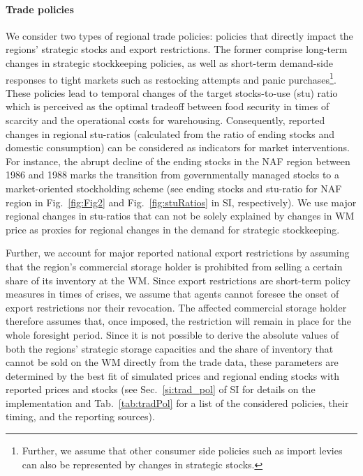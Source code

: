 \documentclass[12pt]{article}
\begin{document}
\paragraph*{Trade policies}
\label{sec:trad_pol}
We consider two types of regional trade policies: policies that directly impact the regions' strategic stocks and export restrictions. The former comprise long-term changes in strategic stockkeeping policies, as well as short-term demand-side responses to tight markets such as restocking attempts and panic purchases\footnote{Further, we assume that other consumer side policies such as import levies can also be represented by changes in strategic stocks.}. These policies lead to temporal changes of the target stocks-to-use (stu) ratio which is perceived as the optimal tradeoff between food security in times of scarcity and the operational costs for warehousing. Consequently, reported changes in regional stu-ratios (calculated from the ratio of ending stocks and domestic consumption) can be considered as indicators for market interventions. For instance, the abrupt decline of the ending stocks in the NAF region between 1986 and 1988 marks the transition from governmentally managed stocks to a market-oriented stockholding scheme \cite{WES99} (see ending stocks and stu-ratio for NAF region in Fig.~\ref{fig:Fig2} and Fig.~\ref{fig:stuRatios} in SI, respectively). We use major regional changes in stu-ratios that can not be solely explained by changes in WM price as proxies for regional changes in the demand for strategic stockkeeping.

Further, we account for major reported national export restrictions by assuming that the region's commercial storage holder is prohibited from selling a certain share of its inventory at the WM. Since export restrictions are short-term policy measures in times of crises, we assume that agents cannot foresee the onset of export restrictions nor their revocation. The affected commercial storage holder  therefore assumes that, once imposed, the restriction will remain in place for the whole foresight period. Since it is not possible to derive the absolute values of both the regions’ strategic storage capacities and the share of inventory that cannot be sold on the WM directly from the trade data, these parameters are determined by the best fit of simulated prices and regional ending stocks with reported prices and stocks (see Sec.~\ref{si:trad_pol} of SI for details on the implementation and Tab.~\ref{tab:tradPol} for a list of the considered policies, their timing, and the reporting sources).
\end{document}
